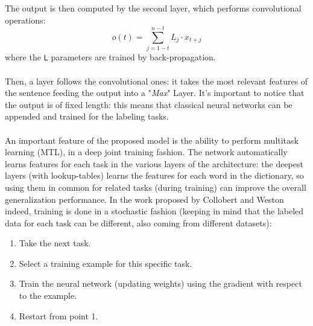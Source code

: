 \documentclass[a4paper,12pt]{report}
\begin{document}
	The output is then computed by the second layer, which performs convolutional operations:
	\begin{equation}
	o(t) = \sum_{j=1-t}^{n-t} L_j \cdot x_{t+j}
	\end{equation}
	where the \texttt{L} parameters are trained by back-propagation.\\\\
	Then, a layer follows the convolutional ones: it takes the most relevant features of the sentence feeding the output into a "\textit{Max}" Layer. It's important to notice that the output is of fixed length: this means that classical neural networks can be appended and trained for the labeling tasks.\\\\
	An important feature of the proposed model is the ability to perform multitask learning (MTL), in a deep joint training fashion. The network automatically learns features for each task in the various layers of the architecture: the deepest layers (with lookup-tables) learns the features for each word in the dictionary, so using them in common for related tasks (during training) can improve the overall generalization performance. In the work proposed by Collobert and Weston indeed, training is done in a stochastic fashion (keeping in mind that the labeled data for each task can be different, also coming from different datasets):
	\begin{enumerate}
		\item Take the next task.
		\item Select a training example for this specific task.
		\item Train the neural network (updating weights) using the gradient with respect to the example.
		\item Restart from point 1.
	\end{enumerate}
\end{document}

